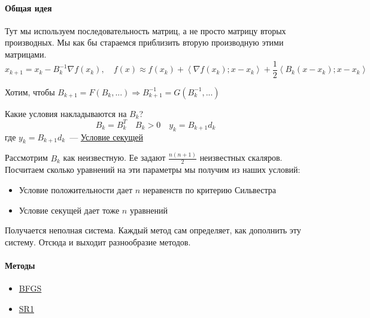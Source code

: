 

\paragraph*{Общая идея}
Тут мы используем последовательность матриц, а не просто матрицу вторых производных.
Мы как бы стараемся приблизить вторую производную этими матрицами.
\[
x_{k+1} = x_k - B_k^{-1} \nabla f(x_k),\quad f(x) \approx f(x_k) + \left\langle \nabla f(x_k); x -x_k \right\rangle + \frac{1}{2} \left\langle B_k(x-x_k); x-x_k \right\rangle
\]

Хотим, чтобы $B_{k+1} = F(B_k, ...) \Rightarrow B_{k+1}^{-1} = G (B_k^{-1}, ...)$

Какие условия накладываются на $B_k$?
\[
B_k = B_k^T\quad B_k > 0\quad y_k = B_{k+1} d_k
\]
где $y_k = B_{k+1}d_k$~--- \hyperref[note:E976DE49-0091-45E1-B621-A236F8B87859]{Условие секущей}

Рассмотрим $B_k$ как неизвестную. Ее задают $\frac{n(n+1)}{2}$ неизвестных скаляров.
Посчитаем сколько уравнений на эти параметры мы получим из наших условий:

\begin{itemize}
  \item Условие положительности дает $n$ неравенств по критерию Сильвестра
  \item Условие секущей дает тоже $n$ уравнений
\end{itemize}

Получается неполная система. Каждый метод сам определяет, как дополнить эту систему.
Отсюда и выходит разнообразие методов.

\paragraph*{Методы}
\begin{itemize}
  \item \hyperref[note:01306845-D37F-480A-8DCE-EE9CA022DA1A]{BFGS}
  \item \hyperref[note:F7506DC4-37FB-4E88-8178-B0FC678233C0]{SR1}
\end{itemize}
